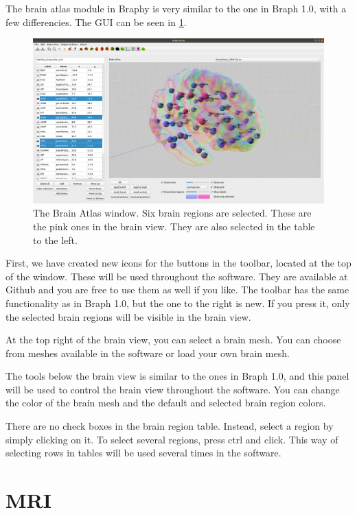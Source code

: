\documentclass{article}
\begin{document}
The brain atlas module in Braphy is very similar to the one in Braph 1.0, with a few differencies. The GUI can be seen in \cref{fig:brain_atlas}.

\begin{figure}[H]
    \centering
    \includegraphics[width=0.9\linewidth]{brain_atlas.png}
    \caption{The Brain Atlas window. Six brain regions are selected. These are the pink ones in the brain view. They are also selected in the table to the left.}
    \label{fig:brain_atlas}
\end{figure}

First, we have created new icons for the buttons in the toolbar, located at the top of the window. These will be used throughout the software. They are available at Github and you are free to use them as well if you like. The toolbar has the same functionality as in Braph 1.0, but the one to the right is new. If you press it, only the selected brain regions will be visible in the brain view.

At the top right of the brain view, you can select a brain mesh. You can choose from meshes available in the software or load your own brain mesh.

The tools below the brain view is similar to the ones in Braph 1.0, and this panel will be used to control the brain view throughout the software. You can change the color of the brain mesh and the default and selected brain region colors.

There are no check boxes in the brain region table. Instead, select a region by simply clicking on it. To select several regions, press ctrl and click. This way of selecting rows in tables will be used several times in the software.

\section{MRI}
\end{document}
